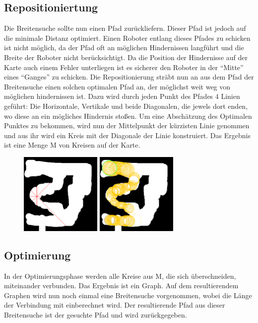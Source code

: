\subsection*{Repositioniertung}
	Die Breitensuche sollte nun einen Pfad zurückliefern. Dieser Pfad ist jedoch auf die minimale Distanz optimiert. Einen Roboter entlang dieses Pfades zu schicken ist nicht möglich, da der Pfad oft an möglichen Hindernissen langführt und die Breite der Roboter nicht berücksichtigt. Da die Position der Hindernisse auf der Karte auch einem Fehler unterliegen ist es sicherer den Roboter in der ``Mitte'' eines ``Ganges'' zu schicken. Die Repositionierung sträbt nun an aus dem Pfad der Breitensuche einen solchen optimalen Pfad an, der möglichst weit weg von möglichen hindernissen ist. Dazu wird durch jeden Punkt des Pfades 4 Linien geführt: Die Horizontale, Vertikale und beide Diagonalen, die jewels dort enden, wo diese an ein mögliches Hindernis stoßen. Um eine Abschätzung des Optimalen Punktes zu bekommen, wird nun der Mittelpunkt der kürzisten Linie genommen und aus ihr wird ein Kreis mit der Diagonale der Linie konstruiert. Das Ergebnis ist eine Menge M von Kreisen auf der Karte. \\


\begin{figure}[ht]
    \centering
	\includegraphics[width=0.35\textwidth, angle=0]{img/p3.png}
	\includegraphics[width=0.35\textwidth, angle=0]{img/p4.png} 
\end{figure}

\subsection*{Optimierung}
	In der Optimierungsphase werden alle Kreise aus M, die sich überschneiden, miteinander verbunden. Das Ergebnis ist ein Graph. Auf dem resultierendem Graphen wird nun noch einmal eine Breitensuche vorgenommen, wobei die Länge der Verbindung mit einberechnet wird. Der resultierende Pfad aus dieser Breitensuche ist der gesuchte Pfad und wird zurückgegeben. \\
	

